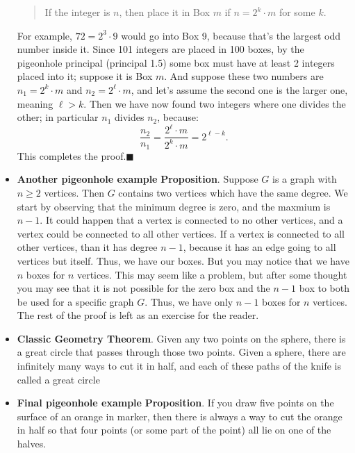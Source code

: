 \documentclass{report}
\begin{document}
\begin{itemize}
\begin{quote}
                If the integer is $n$, then place it in Box $m$ if $n = 2^k \cdot m$ for some $k$.
            \end{quote}
            \bigbreak \noindent 
            For example, $72 = 2^3 \cdot 9$ would go into Box 9, because that's the largest odd number inside it.
            \bigbreak \noindent 
            Since 101 integers are placed in 100 boxes, by the pigeonhole principal (principal 1.5) some box must have at least 2 integers placed into it; suppose it is Box $m$. And suppose these two numbers are $n_1 = 2^k \cdot m$ and $n_2 = 2^\ell \cdot m$, and let’s assume the second one is the larger one, meaning $\ell > k$. Then we have now found two integers where one divides the other; in particular $n_1$ divides $n_2$, because:
            \[
                \frac{n_2}{n_1} = \frac{2^\ell \cdot m}{2^k \cdot m} = 2^{\ell - k}.
            \]
            This completes the proof.$\blacksquare$
        \item \textbf{Another pigeonhole example}
            \bigbreak \noindent 
            \textbf{Proposition}. Suppose $G$ is a graph with $n \geq 2$ vertices. Then $G$ contains two vertices which have the same degree.
            \bigbreak \noindent 
            We start by observing that the minimum degree is zero, and the maxmium is $n-1$. It could happen that a vertex is connected to no other vertices, and a vertex could be connected to all other vertices. If a vertex is connected to all other vertices, than it has degree $n-1$, because it has an edge going to all vertices but itself. Thus, we have our boxes. But you may notice that we have $n$ boxes for $n$ vertices. This may seem like a problem, but after some thought you may see that it is not possible for the zero box and the $n-1$ box to both be used for a specific graph $G$. Thus, we have only $n-1$ boxes for $n$ vertices.
            \bigbreak \noindent 
            The rest of the proof is left as an exercise for the reader.
        \item \textbf{Classic Geometry Theorem}. Given any two points on the sphere, there is a great circle that passes through those two points. 
            \bigbreak \noindent 
            Given a sphere, there are infinitely many ways to cut it in half, and each of these paths of the knife is called a great circle
            \bigbreak \noindent 
        \item \textbf{Final pigeonhole example}
            \bigbreak \noindent 
            \textbf{Proposition}. If you draw five points on the surface of an orange in marker, then there is always a way to cut the orange in half so that four points (or some part of the point) all lie on one of the halves.

\end{itemize}
\end{document}
